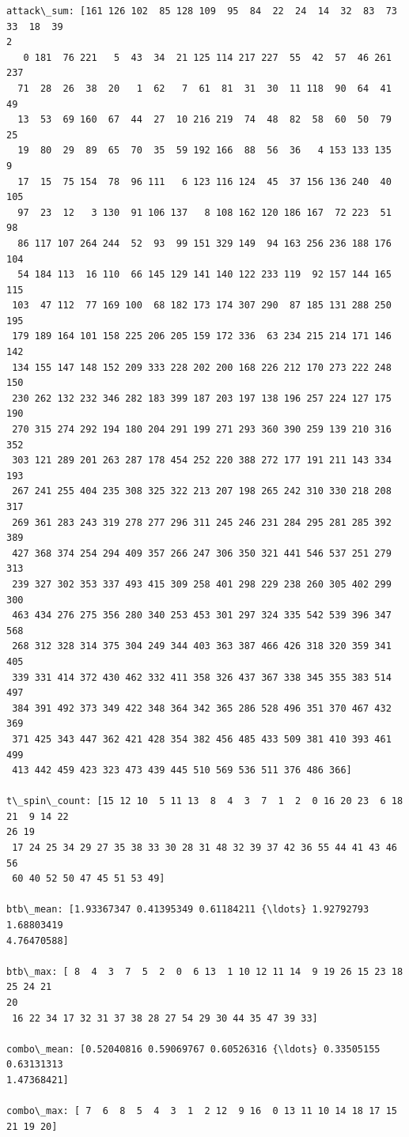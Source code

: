 \documentclass[11pt]{article}
\begin{document}
\begin{Verbatim}[commandchars=\\\{\}]
attack\_sum: [161 126 102  85 128 109  95  84  22  24  14  32  83  73  33  18  39
2
   0 181  76 221   5  43  34  21 125 114 217 227  55  42  57  46 261 237
  71  28  26  38  20   1  62   7  61  81  31  30  11 118  90  64  41  49
  13  53  69 160  67  44  27  10 216 219  74  48  82  58  60  50  79  25
  19  80  29  89  65  70  35  59 192 166  88  56  36   4 153 133 135   9
  17  15  75 154  78  96 111   6 123 116 124  45  37 156 136 240  40 105
  97  23  12   3 130  91 106 137   8 108 162 120 186 167  72 223  51  98
  86 117 107 264 244  52  93  99 151 329 149  94 163 256 236 188 176 104
  54 184 113  16 110  66 145 129 141 140 122 233 119  92 157 144 165 115
 103  47 112  77 169 100  68 182 173 174 307 290  87 185 131 288 250 195
 179 189 164 101 158 225 206 205 159 172 336  63 234 215 214 171 146 142
 134 155 147 148 152 209 333 228 202 200 168 226 212 170 273 222 248 150
 230 262 132 232 346 282 183 399 187 203 197 138 196 257 224 127 175 190
 270 315 274 292 194 180 204 291 199 271 293 360 390 259 139 210 316 352
 303 121 289 201 263 287 178 454 252 220 388 272 177 191 211 143 334 193
 267 241 255 404 235 308 325 322 213 207 198 265 242 310 330 218 208 317
 269 361 283 243 319 278 277 296 311 245 246 231 284 295 281 285 392 389
 427 368 374 254 294 409 357 266 247 306 350 321 441 546 537 251 279 313
 239 327 302 353 337 493 415 309 258 401 298 229 238 260 305 402 299 300
 463 434 276 275 356 280 340 253 453 301 297 324 335 542 539 396 347 568
 268 312 328 314 375 304 249 344 403 363 387 466 426 318 320 359 341 405
 339 331 414 372 430 462 332 411 358 326 437 367 338 345 355 383 514 497
 384 391 492 373 349 422 348 364 342 365 286 528 496 351 370 467 432 369
 371 425 343 447 362 421 428 354 382 456 485 433 509 381 410 393 461 499
 413 442 459 423 323 473 439 445 510 569 536 511 376 486 366]

t\_spin\_count: [15 12 10  5 11 13  8  4  3  7  1  2  0 16 20 23  6 18 21  9 14 22
26 19
 17 24 25 34 29 27 35 38 33 30 28 31 48 32 39 37 42 36 55 44 41 43 46 56
 60 40 52 50 47 45 51 53 49]

btb\_mean: [1.93367347 0.41395349 0.61184211 {\ldots} 1.92792793 1.68803419
4.76470588]

btb\_max: [ 8  4  3  7  5  2  0  6 13  1 10 12 11 14  9 19 26 15 23 18 25 24 21
20
 16 22 34 17 32 31 37 38 28 27 54 29 30 44 35 47 39 33]

combo\_mean: [0.52040816 0.59069767 0.60526316 {\ldots} 0.33505155 0.63131313
1.47368421]

combo\_max: [ 7  6  8  5  4  3  1  2 12  9 16  0 13 11 10 14 18 17 15 21 19 20]


\end{Verbatim}
\end{document}

